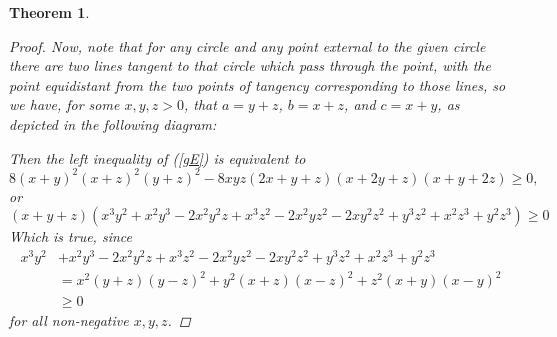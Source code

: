 \documentclass[12pt,notitlepage]{amsart}%
\newtheorem{theorem}{Theorem}[section]
\begin{document}
\begin{theorem}
\begin{proof}
    Now, note that for any circle and any point external to the given circle there are two
        lines tangent to that circle which pass through the point, with the point equidistant 
        from the two points of tangency corresponding to those lines, so we have, for some 
        $x,y,z>0$, that $a=y+z$, $b=x+z$, and $c=x+y$, as depicted in the following diagram:
        \begin{center}
        \end{center}
    Then the left inequality of (\ref{gE}) is equivalent to 
    \[8(x+y)^2(x+z)^2(y+z)^2-8xyz(2x+y+z)(x+2y+z)(x+y+2z)\geq0,\]
    or 
    \[
    (x + y + z) (x^3 y^2 + x^2 y^3 - 2 x^2 y^2 z + x^3 z^2 - 
   2 x^2 y z^2 - 2 x y^2 z^2 + y^3 z^2 + x^2 z^3 + y^2 z^3)\geq 0\]
   Which is true, since 
   \begin{align*}
   x^3 y^2 &+ x^2 y^3 - 2 x^2 y^2 z + x^3 z^2 - 2 x^2 y z^2 - 2 x y^2 z^2 + y^3 z^2 + x^2 z^3 + y^2 z^3\\
   &=x^2(y+z)(y-z)^2+y^2(x+z)(x-z)^2+z^2(x+y)(x-y)^2\\
   &\geq 0
   \end{align*}
   for all non-negative $x,y,z$.
    

\end{proof}
\end{theorem}
\end{document}
